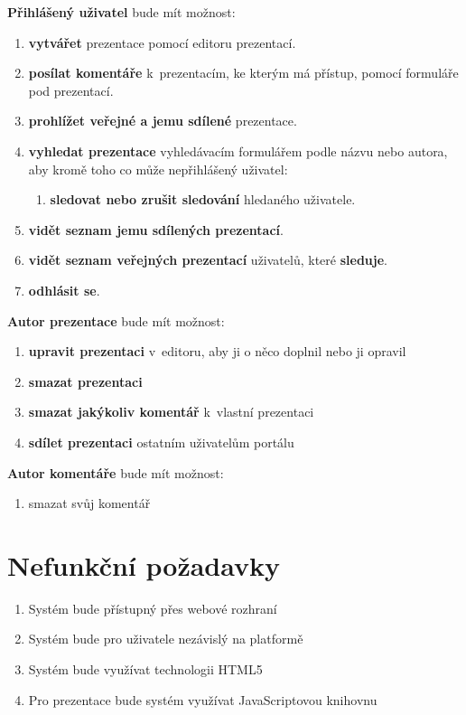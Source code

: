 \documentclass[11pt,twoside,a4paper]{book}
\begin{document}
\noindent \textbf{Přihlášený uživatel} bude mít možnost:
\begin{enumerate}
	\item \textbf{vytvářet} prezentace pomocí editoru prezentací.
	\item \textbf{posílat komentáře} k~prezentacím, ke kterým má přístup, pomocí formuláře pod prezentací.
	\item \textbf{prohlížet veřejné a jemu sdílené} prezentace.
	\item \textbf{vyhledat prezentace} vyhledávacím formulářem podle názvu nebo autora, aby kromě toho co může nepřihlášený uživatel:
		\begin{enumerate}[label*=\arabic*.]
		\item \textbf{sledovat nebo zrušit sledování} hledaného uživatele.
		\end{enumerate}
	\item \textbf{vidět seznam jemu sdílených prezentací}.
	\item \textbf{vidět seznam veřejných prezentací} uživatelů, které \textbf{sleduje}.
	\item \textbf{odhlásit se}.
\end{enumerate}


\noindent \textbf{Autor prezentace} bude mít možnost:
\begin{enumerate}
	\item \textbf{upravit prezentaci} v~editoru, aby ji o něco doplnil nebo ji opravil
	\item \textbf{smazat prezentaci}
	\item \textbf{smazat jakýkoliv komentář} k~vlastní prezentaci
	\item \textbf{sdílet prezentaci} ostatním uživatelům portálu
\end{enumerate}


\noindent \textbf{Autor komentáře} bude mít možnost:
\begin{enumerate}
	\item smazat svůj komentář
\end{enumerate}


\section{Nefunkční požadavky}
\begin{enumerate}
	\item Systém bude přístupný přes webové rozhraní
	\item Systém bude pro uživatele nezávislý na platformě
	\item Systém bude využívat technologii HTML5
	\item Pro prezentace bude systém využívat JavaScriptovou knihovnu
\end{enumerate}
\end{document}
